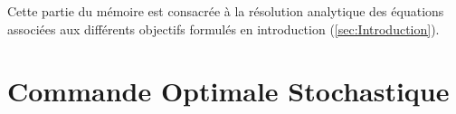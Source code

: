 \label{sec:Theme1}

Cette partie du mémoire est consacrée à la résolution analytique des équations associées aux différents objectifs formulés en introduction (\ref{sec:Introduction}).

\section{Commande Optimale Stochastique}
